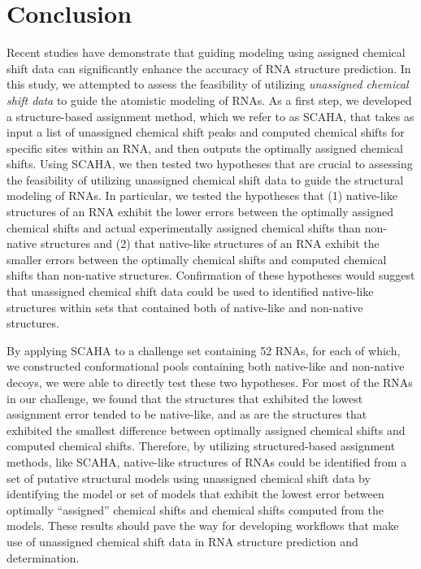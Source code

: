 \documentclass[journal=jcisd8,manuscript=article,layout=onecolumn]{achemso}
\begin{document}
{\section{Conclusion}
Recent studies have demonstrate that guiding modeling  using assigned chemical shift data can significantly enhance the accuracy of RNA structure prediction. In this study, we attempted to assess the feasibility of utilizing  \textit{unassigned chemical shift data} to guide the atomistic modeling of RNAs. As a first step, we developed a structure-based assignment method, which we refer to as SCAHA, that takes as input a list of unassigned chemical shift peaks and computed chemical shifts for specific sites within an RNA, and then outputs the optimally assigned chemical shifts. Using SCAHA, we then tested two hypotheses that are crucial to assessing the feasibility of utilizing unassigned chemical shift data to guide the structural modeling of RNAs. In particular, we tested the hypotheses that (1) native-like structures of an RNA exhibit the lower errors between the optimally assigned chemical shifts and actual experimentally assigned chemical shifts than non-native structures and (2) that native-like structures of an RNA exhibit the smaller errors between the optimally chemical shifts and computed chemical shifts than non-native structures. Confirmation of these hypotheses would suggest that unassigned chemical shift data could be used to identified native-like structures within sets that contained both of native-like and non-native structures.

By applying SCAHA to a challenge set containing 52 RNAs, for each of which, we constructed conformational pools containing both native-like and non-native decoys, we were able to directly test these two hypotheses. For most of the RNAs in our challenge, we found that the structures that exhibited the lowest assignment error tended to be native-like, and as are the structures that exhibited the smallest difference between optimally assigned chemical shifts and computed chemical shifts. Therefore, by utilizing structured-based assignment methods, like SCAHA, native-like structures of RNAs could be identified from a set of putative structural models using unassigned chemical shift data by identifying the model or set of models that exhibit the lowest error between optimally ``assigned'' chemical shifts and chemical shifts computed from the models. These results should pave the way for developing workflows that make use of unassigned chemical shift data in RNA structure prediction and determination.

}
\end{document}
